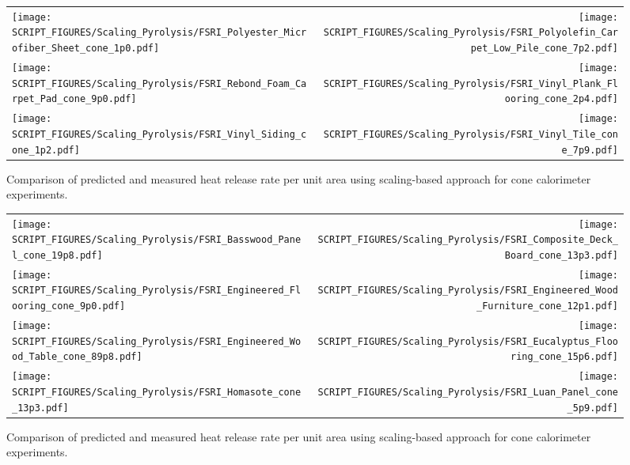 \begin{figure}[p]
\begin{tabular*}{\textwidth}{l@{\extracolsep{\fill}}r}
\texttt{[image: SCRIPT\_FIGURES/Scaling\_Pyrolysis/FSRI\_Polyester\_Microfiber\_Sheet\_cone\_1p0.pdf]} &
\texttt{[image: SCRIPT\_FIGURES/Scaling\_Pyrolysis/FSRI\_Polyolefin\_Carpet\_Low\_Pile\_cone\_7p2.pdf]} \\
\texttt{[image: SCRIPT\_FIGURES/Scaling\_Pyrolysis/FSRI\_Rebond\_Foam\_Carpet\_Pad\_cone\_9p0.pdf]} &
\texttt{[image: SCRIPT\_FIGURES/Scaling\_Pyrolysis/FSRI\_Vinyl\_Plank\_Flooring\_cone\_2p4.pdf]} \\
\texttt{[image: SCRIPT\_FIGURES/Scaling\_Pyrolysis/FSRI\_Vinyl\_Siding\_cone\_1p2.pdf]} &
\texttt{[image: SCRIPT\_FIGURES/Scaling\_Pyrolysis/FSRI\_Vinyl\_Tile\_cone\_7p9.pdf]} \\
\end{tabular*}
\caption[HRRPUA of FSRI Materials using scaling model , Polymers materials]
{Comparison of predicted and measured heat release rate per unit area using scaling-based approach for cone calorimeter experiments.}
\label{FSRI_Materials_HRR_Polymers}
\end{figure}

\begin{figure}[p]
\begin{tabular*}{\textwidth}{l@{\extracolsep{\fill}}r}
\texttt{[image: SCRIPT\_FIGURES/Scaling\_Pyrolysis/FSRI\_Basswood\_Panel\_cone\_19p8.pdf]} &
\texttt{[image: SCRIPT\_FIGURES/Scaling\_Pyrolysis/FSRI\_Composite\_Deck\_Board\_cone\_13p3.pdf]} \\
\texttt{[image: SCRIPT\_FIGURES/Scaling\_Pyrolysis/FSRI\_Engineered\_Flooring\_cone\_9p0.pdf]} &
\texttt{[image: SCRIPT\_FIGURES/Scaling\_Pyrolysis/FSRI\_Engineered\_Wood\_Furniture\_cone\_12p1.pdf]} \\
\texttt{[image: SCRIPT\_FIGURES/Scaling\_Pyrolysis/FSRI\_Engineered\_Wood\_Table\_cone\_89p8.pdf]} &
\texttt{[image: SCRIPT\_FIGURES/Scaling\_Pyrolysis/FSRI\_Eucalyptus\_Flooring\_cone\_15p6.pdf]} \\
\texttt{[image: SCRIPT\_FIGURES/Scaling\_Pyrolysis/FSRI\_Homasote\_cone\_13p3.pdf]} &
\texttt{[image: SCRIPT\_FIGURES/Scaling\_Pyrolysis/FSRI\_Luan\_Panel\_cone\_5p9.pdf]} \\
\end{tabular*}
\caption[HRRPUA of FSRI Materials using scaling model , Wood-Based materials]
{Comparison of predicted and measured heat release rate per unit area using scaling-based approach for cone calorimeter experiments.}
\label{FSRI_Materials_HRR_Wood-Based}
\end{figure}

